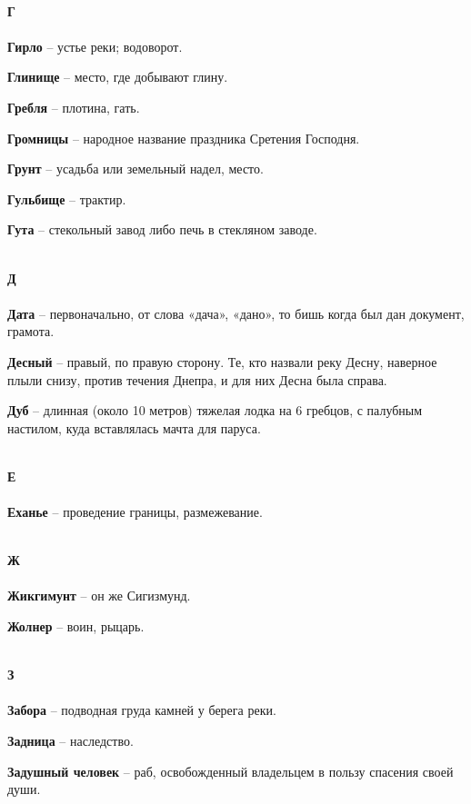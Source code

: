 \begin{multicols}{2}
\mbox{ }\\
\textbf{Г\\}
\mbox{ }\\

\textbf{Гирло} – устье реки; водоворот.

\textbf{Глинище} – место, где добывают глину.

\textbf{Гребля} – плотина, гать.

\textbf{Громницы} – народное название праздника Сретения Господня.

\textbf{Грунт} – усадьба или земельный надел, место. 

\textbf{Гульбище} – трактир.

\textbf{Гута} – стекольный завод либо печь в стекляном заводе.

\mbox{ }\\
\textbf{Д\\}
\mbox{ }\\

\textbf{Дата} – первоначально, от слова «дача», «дано», то бишь когда был дан документ, грамота. 

\textbf{Десный} – правый, по правую сторону. Те, кто назвали реку Десну, наверное плыли снизу, против течения Днепра, и для них Десна была справа.

\textbf{Дуб} – длинная (около 10 метров) тяжелая лодка на 6 гребцов, с палубным настилом, куда вставлялась мачта для паруса.

\mbox{ }\\
\textbf{Е\\}
\mbox{ }\\

\textbf{Еханье} – проведение границы, размежевание.

\mbox{ }\\
\textbf{Ж\\}
\mbox{ }\\

\textbf{Жикгимунт} – он же Сигизмунд.

\textbf{Жолнер} – воин, рыцарь.

\mbox{ }\\
\textbf{З\\}
\mbox{ }\\

\textbf{Забора} – подводная груда камней у берега реки.

\textbf{Задница} – наследство.

\textbf{Задушный человек} – раб, освобожденный владельцем в пользу спасения своей души.


\end{multicols}
